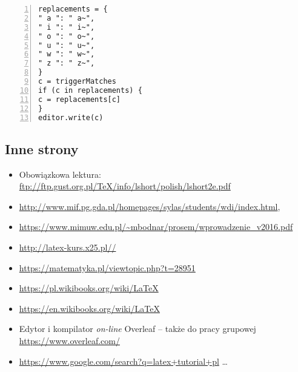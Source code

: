 \begin{lstlisting}[label=lst:sierotki,caption={Widok edytora TeXstudio -- dodanie makra do sierotek},numbers=left]
%SCRIPT
replacements = {
" a ": " a~",
" i ": " i~",
" o ": " o~",
" u ": " u~",
" w ": " w~",
" z ": " z~",
}
c = triggerMatches
if (c in replacements) {
c = replacements[c]
}
editor.write(c)
\end{lstlisting}


\subsection{Inne strony}
\begin{itemize}
\item Obowiązkowa lektura: \url{ftp://ftp.gust.org.pl/TeX/info/lshort/polish/lshort2e.pdf}	
\item \url{http://www.mif.pg.gda.pl/homepages/sylas/students/wdi/index.html},
\item \url{https://www.mimuw.edu.pl/~mbodnar/prosem/wprowadzenie_v2016.pdf}	
\item \url{http://latex-kurs.x25.pl//}
\item \url{https://matematyka.pl/viewtopic.php?t=28951}	
\item \url{https://pl.wikibooks.org/wiki/LaTeX}	
\item \url{https://en.wikibooks.org/wiki/LaTeX}
\item Edytor i kompilator \textit{on-line} Overleaf -- także do pracy grupowej \url{https://www.overleaf.com/}
\item \url{https://www.google.com/search?q=latex+tutorial+pl} \dots	
\end{itemize}
